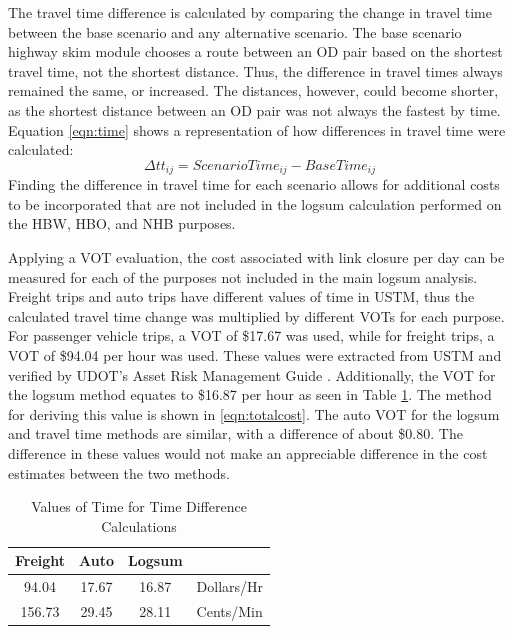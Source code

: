 The travel time difference is calculated by comparing the change in travel
time between the base scenario and any alternative scenario. The base
scenario highway skim module chooses a route between an OD pair based on
the shortest travel time, not the shortest distance. Thus, the difference
in travel times always remained the same, or increased. The distances, however,
could become shorter, as the shortest distance between an OD pair was not
always the fastest by time. Equation \ref{eqn:time} shows a representation of how
differences in travel time were calculated:
\begin{equation}
	\Delta tt_{ij} = ScenarioTime_{ij} - BaseTime_{ij}
	\label{eqn:time}
\end{equation}
Finding the difference in travel time for each scenario allows for
additional costs to be incorporated that are not included in the logsum
calculation performed on the HBW, HBO, and NHB purposes.

Applying a VOT evaluation, the cost associated with link
closure per day can be measured for each of the purposes not included in
the main logsum analysis. Freight trips and auto trips have different
values of time in USTM, thus the calculated travel time change was
multiplied by different VOTs for each purpose. For passenger vehicle
trips, a VOT of \$17.67 was used, while for freight trips, a VOT of
\$94.04 per hour was used. These values were extracted from USTM and
verified by UDOT's Asset Risk Management Guide \citep{UtahDepartmentofTransportation2020}.
Additionally, the VOT for the logsum method equates to \$16.87 per hour as seen in
Table \ref{tab:VOT}. The method for deriving this value is shown in \ref{eqn:totalcost}.
The auto VOT for the logsum and travel time methods are similar, with a difference
of about \$0.80. The difference in these values would not make an appreciable difference
in the cost estimates between the two methods.

\begin{table}


\caption{\label{tab:VOT}Values of Time for Time Difference Calculations}
\centering
\begin{tabular}[t]{cccl}
\toprule
Freight & Auto & Logsum\\
\midrule
94.04 & 17.67 & 16.87 & Dollars/Hr\\
156.73 & 29.45 & 28.11 & Cents/Min\\
\bottomrule
\end{tabular}
\end{table}

